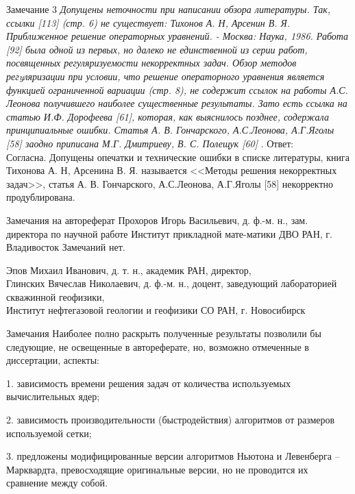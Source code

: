 \documentclass[10pt,pdf, mathserif, hyperref={unicode}]{beamer}
\begin{document}
\begin{frame}{Замечание 3}
	\scriptsize\textit{Допущены неточности при написании обзора литературы. Так, ссылки [113] (стр. 6) не существует:
		Тихонов А. Н, Арсенин В. Я. Приближенное решение операторных уравнений. - Москва: Наука, 1986.
		Работа [92] была одной из первых, но далеко не единственной из серии работ, посвященных регуляризуемости некорректных задач. Обзор методов регyляризации при условии, что решение операторного уравнения является функцией ограниченной вариации (стр. 8), не содержит ссылок на работы А.С. Леонова получившего наиболее существенные результаты. Зато есть ссылка на статью И.Ф. Дорофеева [61], которая, как выяснилось позднее, содержала принципиальные ошибки. Статья А. В. Гончарского, А.С.Леонова, А.Г.Яголы [58] заодно приписана М.Г. Дмитриеву, В. С. Полещук [60]
		}.
	\vskip 5mm
	Ответ:\\
	Согласна. Допущены опечатки и технические ошибки в списке литературы, книга Тихонова А. Н, Арсенина В. Я. называется <<Методы решения некорректных задач>>, статья А. В. Гончарского, А.С.Леонова, А.Г.Яголы [58] некорректно продублирована.
\end{frame}

\begin{frame}{Замечания на автореферат}
	Прохоров Игорь Васильевич, д. ф.-м. н., зам. директора по научной работе Институт прикладной мате-матики ДВО РАН, г. Владивосток
	\vskip 5mm
	Замечаний нет.
\end{frame}
\begin{frame}
	Эпов Михаил Иванович, д. т. н., академик РАН, директор,\\
	\vskip 5mm
	Глинских Вячеслав Николаевич, д. ф.-м. н., доцент, заведующий лабораторией скважинной геофизики,\\
	\vskip 5mm
	Институт нефтегазовой геологии и геофизики СО РАН, г. Новосибирск 
	
\end{frame}
\begin{frame}{Замечания}
	Наиболее полно раскрыть полученные результаты позволили бы следующие, не освещенные в автореферате, но, возможно отмеченные в диссертации, аспекты:
	
	1.	зависимость времени решения задач от количества используемых вычислительных ядер;
	
	2.	зависимость производительности (быстродействия) алгоритмов от размеров используемой сетки;
	
	3.	предложены модифицированные версии алгоритмов Ньютона и Левенберга -- Марквардта, превосходящие оригинальные версии, но не проводится их сравнение между собой.
	
\end{frame}
\end{document}
